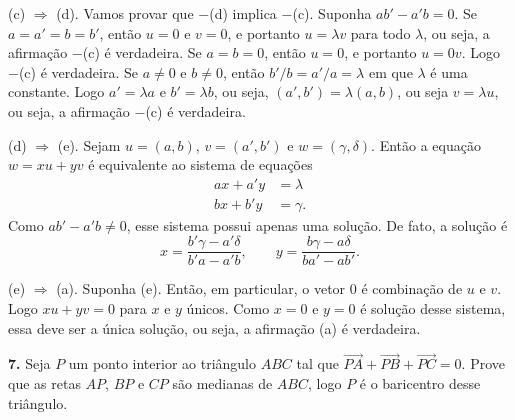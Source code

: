 \documentclass[a4paper,11pt]{article}
\begin{document}
(c) $\Rightarrow$ (d).
Vamos provar que $-$(d) implica $-$(c).
Suponha $a b' - a' b = 0$.
Se $a = a' = b = b'$, então $u = 0$ e $v = 0$, e portanto $u = \lambda v$ para todo $\lambda$, ou seja, a afirmação $-$(c) é verdadeira.
Se $a = b = 0$, então $u = 0$, e portanto $u = 0v$.
Logo $-$(c) é verdadeira.
Se $a \neq 0$ e $b \neq 0$, então $b'/b = a'/a = \lambda$ em que $\lambda$ é uma constante.
Logo $a' = \lambda a$ e $b' = \lambda b$, ou seja, $(a', b') = \lambda (a, b)$, ou seja $v = \lambda u$, ou seja, a afirmação $-$(c) é verdadeira.

(d) $\Rightarrow$ (e).
Sejam $u = (a,b)$, $v = (a',b')$ e $w = (\gamma,\delta)$.
Então a equação $w = xu + yv$ é equivalente ao sistema de equações
\begin{align*}
  a x + a' y & = \lambda \\
  b x + b' y & = \gamma.
\end{align*}
Como $a b' - a' b \neq 0$, esse sistema possui apenas uma solução.
De fato, a solução é
\[
  x = \frac{b' \gamma - a' \delta}{b' a - a' b}, \qquad y = \frac{b \gamma - a \delta}{b a' - a b'}.
\]

(e) $\Rightarrow$ (a).
Suponha (e).
Então, em particular, o vetor $0$ é combinação de $u$ e $v$.
Logo $xu + yv = 0$ para $x$ e $y$ únicos.
Como $x = 0$ e $y = 0$ é solução desse sistema, essa deve ser a única solução, ou seja, a afirmação (a) é verdadeira.

\vspace{\baselineskip}

\textbf{7.}
Seja $P$ um ponto interior ao triângulo $ABC$ tal que $\overrightarrow{PA} \!+\! \overrightarrow{PB} + \overrightarrow{PC} = 0$.
Prove que as retas $AP$, $BP$ e $CP$ são medianas de $ABC$, logo $P$ é o ba\-ri\-cen\-tro desse triângulo.

\vspace{\baselineskip}
\end{document}
